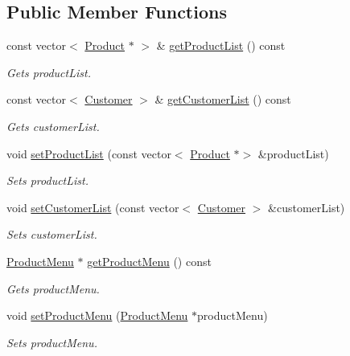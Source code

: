 \subsection*{Public Member Functions}
\begin{DoxyCompactItemize}
\item 
const vector$<$ \hyperlink{classProduct}{Product} $\ast$ $>$ \& \hyperlink{classMainMenu_ae122d42a6ffd8735c4abcd789473a4e9}{get\+Product\+List} () const
\begin{DoxyCompactList}\small\item\em Gets product\+List. \end{DoxyCompactList}\item 
const vector$<$ \hyperlink{classCustomer}{Customer} $>$ \& \hyperlink{classMainMenu_ac1e7ab45aeaf1245b7dd534e2a535ed8}{get\+Customer\+List} () const
\begin{DoxyCompactList}\small\item\em Gets customer\+List. \end{DoxyCompactList}\item 
void \hyperlink{classMainMenu_aae749e64ea9bf630ae4340a446bcf8a7}{set\+Product\+List} (const vector$<$ \hyperlink{classProduct}{Product} $\ast$$>$ \&product\+List)
\begin{DoxyCompactList}\small\item\em Sets product\+List. \end{DoxyCompactList}\item 
void \hyperlink{classMainMenu_aa78eaffbe8203475575aac6f330497c9}{set\+Customer\+List} (const vector$<$ \hyperlink{classCustomer}{Customer} $>$ \&customer\+List)
\begin{DoxyCompactList}\small\item\em Sets customer\+List. \end{DoxyCompactList}\item 
\hyperlink{classProductMenu}{Product\+Menu} $\ast$ \hyperlink{classMainMenu_a96cf34491424fb414023b2ae6f64540b}{get\+Product\+Menu} () const
\begin{DoxyCompactList}\small\item\em Gets product\+Menu. \end{DoxyCompactList}\item 
void \hyperlink{classMainMenu_aaca12cbc08bfe9533544375cd8da5a8e}{set\+Product\+Menu} (\hyperlink{classProductMenu}{Product\+Menu} $\ast$product\+Menu)
\begin{DoxyCompactList}\small\item\em Sets product\+Menu. \end{DoxyCompactList}\item 
$$
\end{DoxyCompactItemize}
